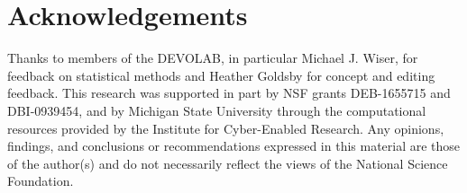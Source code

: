 \section{Acknowledgements}

Thanks to members of the DEVOLAB, in particular Michael J. Wiser, for feedback on statistical methods and Heather Goldsby for concept and editing feedback.
This research was supported in part by NSF grants DEB-1655715 and DBI-0939454, and by Michigan State University through the computational resources provided by the Institute for Cyber-Enabled Research.
Any opinions, findings, and conclusions or recommendations expressed in this material are those of the author(s) and do not necessarily reflect the views of the National Science Foundation.
